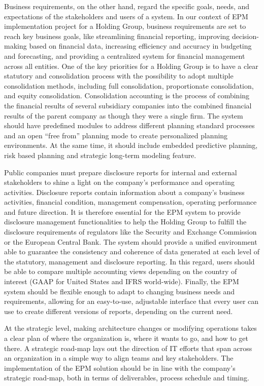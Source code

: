 \documentclass[12pt,a4paper,openright,twoside]{book}
\begin{document}
Business requirements, on the other hand, regard the specific goals, needs, and expectations of the stakeholders and users of a system. 
%
In our context of EPM implementation project for a Holding Group, business requirements are set to reach key business goals, like streamlining financial reporting, improving decision-making based on financial data, increasing efficiency and accuracy in budgeting and forecasting, and providing a centralized system for financial management across all entities. 
%
One of the key priorities for a Holding Group is to have a clear statutory and consolidation process with the possibility to adopt multiple consolidation methods, including full consolidation, proportionate consolidation, and equity consolidation.
%
Consolidation accounting is the process of combining the financial results of several subsidiary companies into the combined financial results of the parent company as though they were a single firm.
%
The system should have predefined modules to address different planning standard processes and an open ``free from'' planning mode to create personalized planning environments. 
%
At the same time, it should include embedded predictive planning, risk based planning and strategic  long-term modeling feature.

Public companies must prepare disclosure reports for internal and external stakeholders to shine a light on the company's performance and operating activities.
%
Disclosure reports contain information about a company's business activities, financial condition, management compensation, operating performance and future direction. 
%
It is therefore essential for the EPM system to provide disclosure management functionalities to help the Holding Group to fulfill the disclosure requirements of regulators like the Security and Exchange Commission or the European Central Bank.
%
The system should provide  a unified environment able to guarantee the consistency and coherence of data generated at each level of the statutory, management and disclosure reporting.
%
In this regard, users should be able to compare multiple accounting views depending on the country of interest (GAAP for United States and IFRS world-wide).
%
Finally, the EPM system should be flexible enough to adapt to changing business needs and requirements, allowing for an easy-to-use, adjustable interface that every user can use to create different versions of reports, depending on the current need.

At the strategic level, making architecture changes or modifying operations takes a clear plan of where the organization is, where it wants to go, and how to get there. 
%
A strategic road-map lays out the direction of IT efforts that span across an organization in a simple way to align teams and key stakeholders.
%
The implementation of the EPM solution should be in line with the company's strategic road-map, both in terms of deliverables, process schedule and timing.
\end{document}
